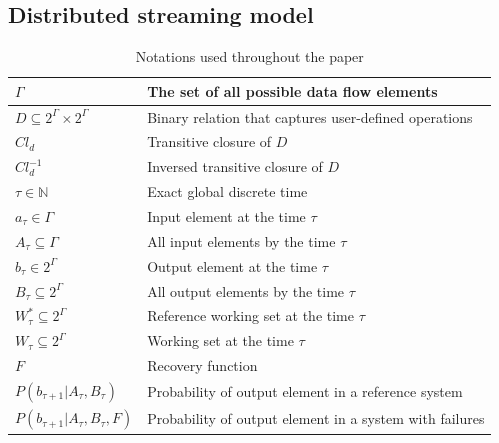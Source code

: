 \label{fs-formalism}

\subsection{Distributed streaming model}

\begin{table}[!b]
    \caption{Notations used throughout the paper}
    \begin{tabular}{l|p{5cm}}
        \hline
        $\Gamma$ & The set of all possible data flow elements \\ 
        \hline
        $D\subseteq{2^{\Gamma}\times2^{\Gamma}}$ & Binary relation that captures user-defined operations  \\
        \hline
        $Cl_d$ & Transitive closure of $D$  \\
        \hline
        $Cl^{-1}_d$ & Inversed transitive closure of $D$  \\
        \hline
        $\tau \in \mathbb{N}$ & Exact global discrete time \\
        \hline
        $a_\tau \in \Gamma$ & Input element at the time $\tau$ \\
        \hline
        $A_\tau \subseteq \Gamma$ & All input elements by the time $\tau$ \\
        \hline
        $b_\tau \in 2^{\Gamma}$ & Output element at the time $\tau$ \\
        \hline
        $B_\tau \subseteq 2^{\Gamma}$ & All output elements by the time $\tau$ \\
        \hline
        $W^{*}_\tau \subseteq 2^{\Gamma}$ & Reference working set at the time $\tau$ \\
        \hline
        $W_\tau \subseteq 2^{\Gamma}$ & Working set at the time $\tau$ \\
        \hline
        $F$ & Recovery function \\
        \hline
        $P(b_{\tau+1}|A_{\tau}, B_\tau)$ & Probability of output element in a reference system \\
        \hline
        $P(b_{\tau+1}|A_{\tau}, B_\tau, F)$ & Probability of output element in a system with failures \\
    \end{tabular}
    \label{notations}
\end{table}

